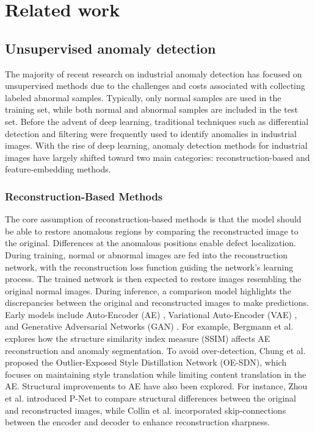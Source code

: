 \section*{Related work}
\label{sec:relatedwork}

\subsection*{Unsupervised anomaly detection}

The majority of recent research on industrial anomaly detection has focused on unsupervised methods due to the challenges and costs associated with collecting labeled abnormal samples. Typically, only normal samples are used in the training set, while both normal and abnormal samples are included in the test set. Before the advent of deep learning, traditional techniques such as differential detection and filtering were frequently used to identify anomalies in industrial images. With the rise of deep learning, anomaly detection methods for industrial images have largely shifted toward two main categories: reconstruction-based and feature-embedding methods.

\subsubsection*{Reconstruction-Based Methods}

The core assumption of reconstruction-based methods is that the model should be able to restore anomalous regions by comparing the reconstructed image to the original. Differences at the anomalous positions enable defect localization. During training, normal or abnormal images are fed into the reconstruction network, with the reconstruction loss function guiding the network's learning process. The trained network is then expected to restore images resembling the original normal images. During inference, a comparison model highlights the discrepancies between the original and reconstructed images to make predictions. Early models include Auto-Encoder (AE) \cite{yu2023unsupervised, collin2021improved}, Variational Auto-Encoder (VAE) \cite{liu2020towards}, and Generative Adversarial Networks (GAN) \cite{akcay2019ganomaly, perera2019ocgan}. For example, Bergmann et al. \cite{bergmann2018improving} explores how the structure similarity index measure (SSIM) affects AE reconstruction and anomaly segmentation. To avoid over-detection, Chung et al. \cite{chung2020unsupervised} proposed the Outlier-Exposed Style Distillation Network (OE-SDN), which focuses on maintaining style translation while limiting content translation in the AE. Structural improvements to AE have also been explored. For instance, Zhou et al. \cite{zhou2020encoding} introduced P-Net to compare structural differences between the original and reconstructed images, while Collin et al. \cite{collin2021improved} incorporated skip-connections between the encoder and decoder to enhance reconstruction sharpness.

